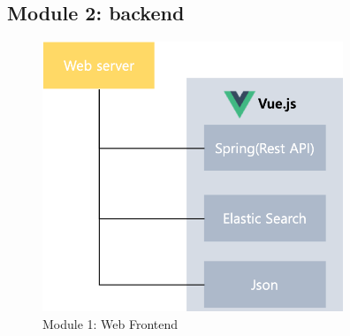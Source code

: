 \documentclass[conference]{IEEEtran}
\begin{document}
  \subsection{Module 2: backend}
\begin{figure}[htbp]
\centerline{\includegraphics[width=90mm,scale=0.5]{fig/6_6.png}}
\caption{Module 1: Web Frontend}
\label{fig}
\end{figure}
\end{document}
